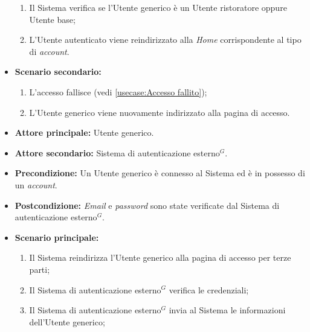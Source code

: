\begin{itemize}
\begin{enumerate}
		      \item Il Sistema verifica se l'Utente generico è un Utente ristoratore oppure Utente base;
		      \item L'Utente autenticato viene reindirizzato alla \textit{Home} corrispondente al tipo di \textit{account}.
	      \end{enumerate}
		
	\item \textbf{Scenario secondario:}
		\begin{enumerate}
			\item L'accesso fallisce (vedi \autoref{usecase:Accesso fallito});
			\item L'Utente generico viene nuovamente indirizzato alla pagina di accesso.
		\end{enumerate}	
	\end{itemize}

\label{usecase:Accesso per terze parti}
\begin{itemize}

	\item \textbf{Attore principale:} Utente generico.
	\item \textbf{Attore secondario:} Sistema di autenticazione esterno$^G$.

	\item \textbf{Precondizione:} Un Utente generico è connesso al Sistema ed è in possesso di un \textit{account}.

	\item \textbf{Postcondizione:} \textit{Email} e \textit{password} sono state verificate dal Sistema di autenticazione esterno$^G$.


	\item \textbf{Scenario principale:}
	\begin{enumerate}
		\item Il Sistema reindirizza l'Utente generico alla pagina di accesso per terze parti;
		\item Il Sistema di autenticazione esterno$^G$ verifica le credenziali;
		\item Il Sistema di autenticazione esterno$^G$ invia al Sistema le informazioni dell'Utente generico;
	\end{enumerate}
	
\end{itemize}

